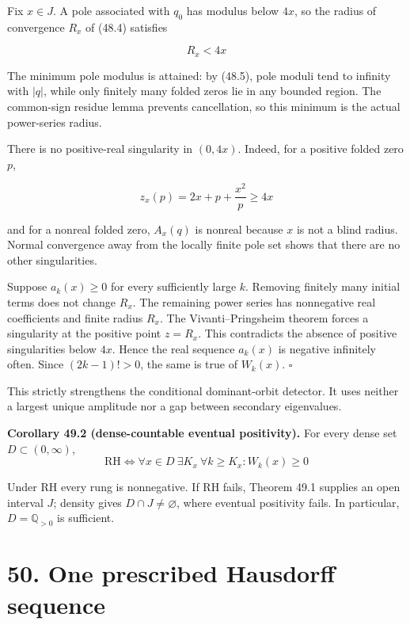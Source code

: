 \documentclass[
  11pt,
]{book}
\renewenvironment{quote}
  {\begin{tcolorbox}[
      enhanced,
      breakable,
      colback=tncream,
      colframe=tnrust,
      boxrule=0.8pt,
      arc=1.5pt,
      left=7pt,
      right=7pt,
      top=6pt,
      bottom=6pt]}
  {\end{tcolorbox}}
\begin{document}
Fix \(x\in J\). A pole associated with \(q_0\) has modulus below \(4x\),
so the radius of convergence \(R_x\) of (48.4) satisfies

\[
R_x<4x
\tag{49.2}
\]

The minimum pole modulus is attained: by (48.5), pole moduli tend to
infinity with \(|q|\), while only finitely many folded zeros lie in any
bounded region. The common-sign residue lemma prevents cancellation, so
this minimum is the actual power-series radius.

There is no positive-real singularity in \((0,4x)\). Indeed, for a
positive folded zero \(p\),

\[
z_x(p)=2x+p+\frac{x^2}{p}\ge4x
\tag{49.3}
\]

and for a nonreal folded zero, \(A_x(q)\) is nonreal because \(x\) is
not a blind radius. Normal convergence away from the locally finite pole
set shows that there are no other singularities.

Suppose \(a_k(x)\ge0\) for every sufficiently large \(k\). Removing
finitely many initial terms does not change \(R_x\). The remaining power
series has nonnegative real coefficients and finite radius \(R_x\). The
Vivanti--Pringsheim theorem forces a singularity at the positive point
\(z=R_x\). This contradicts the absence of positive singularities below
\(4x\). Hence the real sequence \(a_k(x)\) is negative infinitely often.
Since \((2k-1)!>0\), the same is true of \(W_k(x)\). \(\square\)

This strictly strengthens the conditional dominant-orbit detector. It
uses neither a largest unique amplitude nor a gap between secondary
eigenvalues.

\begin{quote}
\textbf{Corollary 49.2 (dense-countable eventual positivity).} For every
dense set \(D\subset(0,\infty)\), \[
\boxed{
\mathrm{RH}
\iff
\forall x\in D\ \exists K_x\ \forall k\ge K_x:
W_k(x)\ge0}
\tag{49.4}
\]
\end{quote}

Under RH every rung is nonnegative. If RH fails, Theorem 49.1 supplies
an open interval \(J\); density gives \(D\cap J\ne\varnothing\), where
eventual positivity fails. In particular, \(D=\mathbb Q_{>0}\) is
sufficient.

\section{50. One prescribed Hausdorff
sequence}\label{one-prescribed-hausdorff-sequence}
\end{document}
